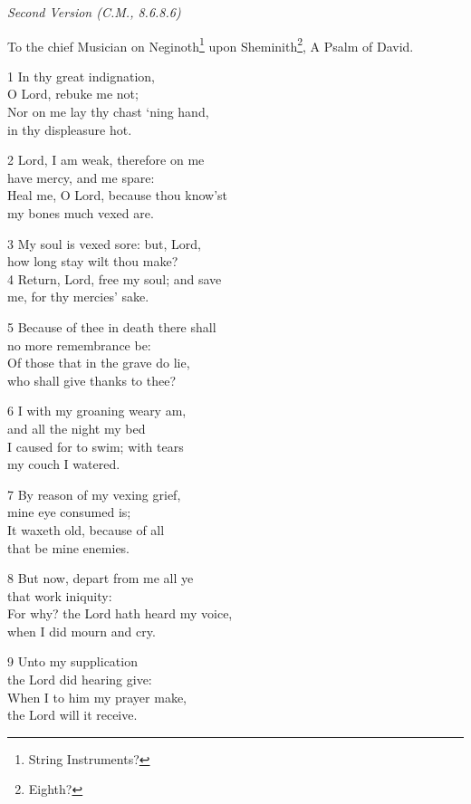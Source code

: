 \begin{center}
\quad{}\quad{}
\end{center}

\emph{Second Version (C.M., 8.6.8.6)}

To the chief Musician on Neginoth\footnote{String Instruments?} upon Sheminith\footnote{Eighth?},
A Psalm of David.

1 In thy great indignation,\\
O Lord, rebuke me not;\\
Nor on me lay thy chast ‘ning hand,\\
in thy displeasure hot.

2 Lord, I am weak, therefore on me\\
have mercy, and me spare:\\
Heal me, O Lord, because thou know’st\\
my bones much vexed are.

3 My soul is vexed sore: but, Lord,\\
how long stay wilt thou make?\\
4 Return, Lord, free my soul; and save\\
me, for thy mercies’ sake.

5 Because of thee in death there shall\\
no more remembrance be:\\
Of those that in the grave do lie,\\
who shall give thanks to thee?

6 I with my groaning weary am,\\
and all the night my bed\\
I caused for to swim; with tears\\
my couch I watered.

7 By reason of my vexing grief,\\
mine eye consumed is;\\
It waxeth old, because of all\\
that be mine enemies.

8 But now, depart from me all ye\\
that work iniquity:\\
For why? the Lord hath heard my voice,\\
when I did mourn and cry.

9 Unto my supplication\\
the Lord did hearing give:\\
When I to him my prayer make,\\
the Lord will it receive.

